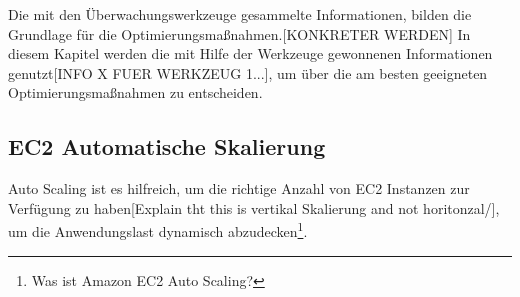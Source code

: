 Die mit den Überwachungswerkzeuge gesammelte Informationen, bilden die Grundlage für die Optimierungsmaßnahmen.[KONKRETER WERDEN]
In diesem Kapitel werden die mit Hilfe der Werkzeuge gewonnenen Informationen genutzt[INFO X FUER WERKZEUG 1...], um über die am besten geeigneten Optimierungsmaßnahmen zu entscheiden.

\subsection{EC2 Automatische Skalierung}
Auto Scaling ist es hilfreich, um die richtige Anzahl von EC2 Instanzen zur Verfügung zu haben[Explain tht this is vertikal Skalierung and not horitonzal/], um die Anwendungslast dynamisch abzudecken\footnote{\cite{AMZ31} Was ist Amazon EC2 Auto Scaling?}.

